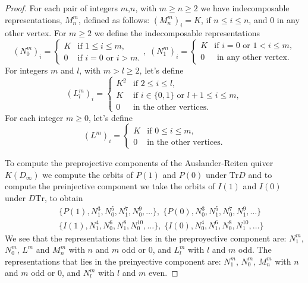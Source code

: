\documentclass{amsart}
\theoremstyle{plain}
\numberwithin{equation}{section}
\begin{document}
\begin{proof}
For each pair of integers $m$,$n$, with $m\ge n\ge 2$ we have indecomposable
representations, $M_{n}^{m}$, defined as follows: $(M_{n}^{m})_{i}=K$, if $n\leq i\leq n$, and $0$ in any other vertex. For $m\geq 2$ we define the
indecomposable representations
\begin{equation*}
(N_{0}^{m})_{i}=\begin{cases}
K & \text{if } 1\le i\leq m , \\
0 & \text{if } i=0\text{ or } i>m.\end{cases},\;(N_{1}^{m})_{i}=\begin{cases}
K & \text{if } i=0\text{ or } 1<i\leq m, \\
0 & \text{ in any  other vertex.}\end{cases}\end{equation*}For integers $m$ and  $l $,  with $m>l \geq 2$, let's define
\begin{equation*}
(L_{l}^{m})_{i}=\begin{cases}
K^{2} & \text{if } 2\le i\le l, \\
K & \text{if } i\in \{0,1\} \text{ or } l+1\le i\le m, \\
0 & \text{in the other vertices}.\end{cases}\end{equation*}For each integer  $m\ge 0$,  let's define
\begin{equation*}
(L^{m})_{i}=\begin{cases}
K & \text{if } 0\le i\le m, \\
0 & \text{in the other vertices}.\end{cases}\end{equation*}

To compute the preprojective components of the Auslander-Reiten quiver $K(D_{\infty })$ we compute the orbits of $P(1)$ and $P(0)$ under $\mathrm{Tr}D$ and to compute the preinjective component we take the orbits of $I(1)$
and $I(0)$ under $D\mathrm{Tr}$, to obtain
\begin{eqnarray*}
&&\{P(1),N_{1}^{3},N_{0}^{5},N_{1}^{7},N_{0}^{9},\ldots
\},\;\{P(0),N_{0}^{3},N_{1}^{5},N_{0}^{7},N_{1}^{9},\ldots \} \\
&&\{I(1),N_{1}^{4},N_{0}^{6},N_{1}^{8},N_{0}^{10},\ldots
\},\;\{I(0),N_{0}^{4},N_{1}^{6},N_{0}^{8},N_{1}^{10},\ldots \}
\end{eqnarray*}We see that the representations that lies in the preproyective component are:
$N_1^m$, $N_0^m$, $L^m$ and $M_n^m$ with $n$ and $m$ odd or $0$, and
 $L_l^m$ with $l$ and $m$ odd. 
The representations that lies in the preinyective  component are:
$N_1^m$, $N_0^m$,  $M_n^m$ with $n$ and $m$ odd or $0$, and $N_l^m$ with $l$ and $m$ even. 


\end{proof}
\end{document}
